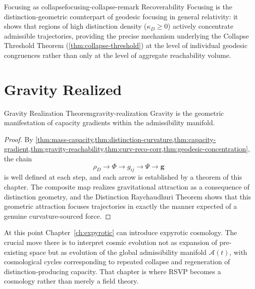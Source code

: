 \documentclass[12pt,twoside,openright]{book}
\begin{document}
\begin{remark}{Focusing as collapse}{focusing-collapse-remark}
  Recoverability Focusing is the distinction-geometric
  counterpart of geodesic focusing in general relativity: it
  shows that regions of high distinction density
  ($\kappa_D \ge 0$) actively concentrate admissible
  trajectories, providing the precise mechanism underlying
  the Collapse Threshold Theorem
  (\cref{thm:collapse-threshold}) at the level of individual
  geodesic congruences rather than only at the level of
  aggregate reachability volume.
\end{remark}

\section{Gravity Realized}
\label{sec:ch17-realization}

\begin{theorem}{Gravity Realization Theorem}{gravity-realization}
  Gravity is the geometric manifestation of capacity
  gradients within the admissibility manifold.
\end{theorem}

\begin{proof}
  By \cref{thm:mass-capacity,thm:distinction-curvature,thm:capacity-gradient,thm:gravity-reachability,thm:curv-reco-corr,thm:geodesic-concentration},
  the chain
  \[
    \rho_D \to \Phi \to g_{ij} \to \Psi \to \mathbf{g}
  \]
  is well defined at each step, and each arrow is
  established by a theorem of this chapter. The composite
  map realizes gravitational attraction as a consequence
  of distinction geometry, and the Distinction Raychaudhuri
  Theorem shows that this geometric attraction focuses
  trajectories in exactly the manner expected of a genuine
  curvature-sourced force.
\end{proof}

At this point Chapter~\ref{ch:expyrotic} can introduce
expyrotic cosmology. The crucial move there is to
interpret cosmic evolution not as expansion of pre-existing
space but as evolution of the global admissibility
manifold $\mathcal{A}(t)$, with cosmological cycles
corresponding to repeated collapse and regeneration of
distinction-producing capacity. That chapter is where RSVP
becomes a cosmology rather than merely a field theory.
\end{document}
